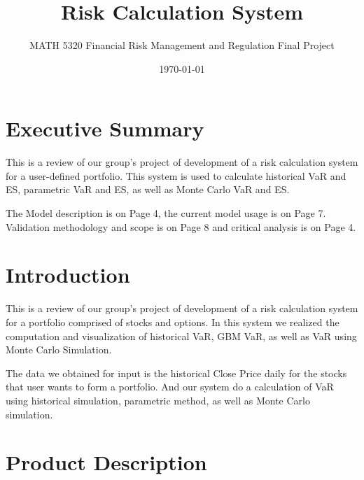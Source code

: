 \documentclass[letterpaper,11pt, oneside]{layout}
\title{Risk Calculation System}
\subtitle{MATH 5320 Financial Risk Management and Regulation Final Project}
\date{\today}
\begin{document}
\cleardoublepage
\maketitle

\frontmatter
\begin{spacing}{1}
%

\tableofcontents
\listoffigures
\listoftables
\end{spacing}


\mainmatter

\chapter{Executive Summary}
\label{chap:summ}


This is a review of our group’s project of development of a risk calculation system for a user-defined portfolio. This system is used to calculate historical VaR and ES, parametric VaR and ES, as well as Monte Carlo VaR and ES.

The Model description is on Page 4, the current  model usage is on Page 7. Validation methodology and scope is on Page 8 and critical analysis is on Page 4.

\begingroup
\renewcommand{\clearpage}{}
\chapter{Introduction}
\label{chap:intro}
\endgroup
This is a review of our group’s project of development of a risk calculation system for a portfolio comprised of stocks and options. In this system we realized the computation and visualization of historical VaR, GBM VaR, as well as VaR using Monte Carlo Simulation. 

The data we obtained for input is the historical Close Price daily for the stocks that user wants to form a portfolio. And our system do a calculation of VaR using historical simulation, parametric method, as well as Monte Carlo simulation.



\begingroup
\renewcommand{\clearpage}{}
\chapter{Product Description}
\label{chap:pd}
\endgroup
\end{document}
